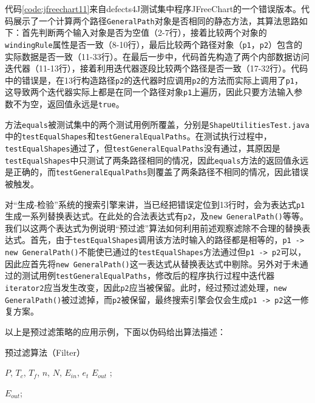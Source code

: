 代码\ref{code:jfreechart11}来自defects4J\cite{Just:2014:DDE:2610384.2628055}测试集中程序JFreeChart的一个错误版本。代码展示了一个计算两个路径\texttt{GeneralPath}对象是否相同的静态方法，其算法思路如下：首先判断两个输入对象是否为空值（2-7行），接着比较两个对象的\texttt{windingRule}属性是否一致（8-10行），最后比较两个路径对象（\texttt{p1}，\texttt{p2}）包含的实际数据是否一致（11-33行）。在最后一步中，代码首先构造了两个内部数据访问迭代器（11-13行），接着利用迭代器逐段比较两个路径是否一致（17-32行）。代码中的错误是，在13行构造路径\texttt{p2}的迭代器时应调用\texttt{p2}的方法而实际上调用了\texttt{p1}，这导致两个迭代器实际上都是在同一个路径对象\texttt{p1}上遍历，因此只要方法输入参数不为空，返回值永远是\texttt{true}。

方法\texttt{equals}被测试集中的两个测试用例所覆盖，分别是\texttt{ShapeUtilitiesTest.java}中的\texttt{testEqualShapes}和\texttt{testGeneralEqualPaths}。在测试执行过程中，\texttt{testEqualShapes}通过了，但\texttt{testGeneralEqualPaths}没有通过，其原因是\texttt{testEqualShapes}中只测试了两条路径相同的情况，因此\texttt{equals}方法的返回值永远是正确的，而\texttt{testGeneralEqualPaths}则覆盖了两条路径不相同的情况，因此错误被触发。

对“生成-检验”系统的搜索引擎来讲，当已经把错误定位到13行时，会为表达式\texttt{p1}生成一系列替换表达式。在此处的合法表达式有\texttt{p2}，及\texttt{new GeneralPath()}等等。我们以这两个表达式为例说明“预过滤”算法如何利用前述观察滤除不合理的替换表达式。首先，由于\texttt{testEqualShapes}调用该方法时输入的路径都是相等的，\texttt{p1 -> new GeneralPath()}不能使已通过的\texttt{testEqualShapes}方法通过但\texttt{p1 -> p2}可以，因此应首先将\texttt{new GeneralPath()}这一表达式从替换表达式中剔除。另外对于未通过的测试用例\texttt{testGeneralEqualPaths}，修改后的程序执行过程中迭代器\texttt{iterator2}应当发生改变，因此\texttt{p2}应当被保留。此时，经过预过滤处理，\texttt{new GeneralPath()}被过滤掉，而\texttt{p2}被保留，最终搜索引擎会仅会生成\texttt{p1 -> p2}这一修复方案。

以上是预过滤策略的应用示例，下面以伪码给出算法描述：


\begin{algorithm}
	\caption{预过滤算法（Filter）}
	\label{alg: pre-filter}
	\begin{algorithmic}[1]
		\renewcommand{\algorithmicrequire}{\textbf{Input:}}
		\renewcommand\algorithmicensure {\textbf{Output:} }
		\REQUIRE $P$, $T_c$, $T_f$, $n$, $N$, $E_{in}$, $e_t$
		\ENSURE $E_{out}$
						;
					\ENDIF
				\ENDFOR
			\ENDWHILE
		\ENDFOR
		
					\ENDIF
				\ENDFOR
			\ENDWHILE
		\ENDFOR		
		\RETURN $E_{out}$;
		
	\end{algorithmic}
\end{algorithm}

